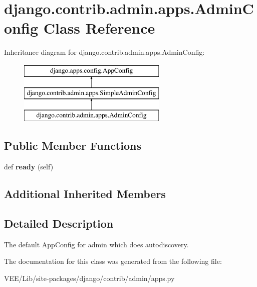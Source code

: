 \hypertarget{classdjango_1_1contrib_1_1admin_1_1apps_1_1_admin_config}{}\section{django.\+contrib.\+admin.\+apps.\+Admin\+Config Class Reference}
\label{classdjango_1_1contrib_1_1admin_1_1apps_1_1_admin_config}
Inheritance diagram for django.\+contrib.\+admin.\+apps.\+Admin\+Config\+:\begin{figure}[H]
\begin{center}
\leavevmode
\includegraphics[height=3.000000cm]{classdjango_1_1contrib_1_1admin_1_1apps_1_1_admin_config}
\end{center}
\end{figure}
\subsection*{Public Member Functions}
\begin{DoxyCompactItemize}
\item 
\mbox{\label{classdjango_1_1contrib_1_1admin_1_1apps_1_1_admin_config_a848af16f8656327d7897c89998d1ce12}} 
def {\bfseries ready} (self)
\end{DoxyCompactItemize}
\subsection*{Additional Inherited Members}


\subsection{Detailed Description}
\begin{DoxyVerb}The default AppConfig for admin which does autodiscovery.\end{DoxyVerb}
 

The documentation for this class was generated from the following file\+:\begin{DoxyCompactItemize}
\item 
V\+E\+E/\+Lib/site-\/packages/django/contrib/admin/apps.\+py\end{DoxyCompactItemize}
